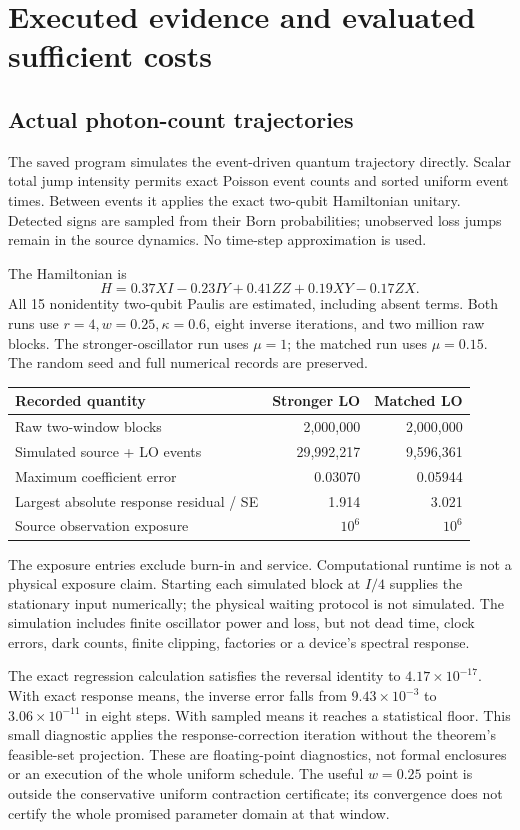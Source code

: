 \documentclass[11pt]{article}
\begin{document}
\section{Executed evidence and evaluated sufficient costs}
\subsection{Actual photon-count trajectories}
The saved program simulates the event-driven quantum trajectory directly. Scalar total jump intensity permits exact Poisson event counts and sorted uniform event times. Between events it applies the exact two-qubit Hamiltonian unitary. Detected signs are sampled from their Born probabilities; unobserved loss jumps remain in the source dynamics. No time-step approximation is used.

The Hamiltonian is
\[
 H=0.37XI-0.23IY+0.41ZZ+0.19XY-0.17ZX.
\]
All 15 nonidentity two-qubit Paulis are estimated, including absent terms. Both runs use \(r=4,w=0.25,\kappa=0.6\), eight inverse iterations, and two million raw blocks. The stronger-oscillator run uses \(\mu=1\); the matched run uses \(\mu=0.15\). The random seed and full numerical records are preserved.

\begin{center}\small
\begin{tabular}{lrr}\toprule
Recorded quantity & Stronger LO & Matched LO\\\midrule
Raw two-window blocks & 2,000,000 & 2,000,000\\
Simulated source + LO events & 29,992,217 & 9,596,361\\
Maximum coefficient error & 0.03070 & 0.05944\\
Largest absolute response residual / SE & 1.914 & 3.021\\
Source observation exposure & \(10^6\) & \(10^6\)\\\bottomrule
\end{tabular}\end{center}
The exposure entries exclude burn-in and service. Computational runtime is not a physical exposure claim. Starting each simulated block at \(I/4\) supplies the stationary input numerically; the physical waiting protocol is not simulated. The simulation includes finite oscillator power and loss, but not dead time, clock errors, dark counts, finite clipping, factories or a device's spectral response.

The exact regression calculation satisfies the reversal identity to \(4.17\times10^{-17}\). With exact response means, the inverse error falls from \(9.43\times10^{-3}\) to \(3.06\times10^{-11}\) in eight steps. With sampled means it reaches a statistical floor. This small diagnostic applies the response-correction iteration without the theorem's feasible-set projection. These are floating-point diagnostics, not formal enclosures or an execution of the whole uniform schedule. The useful \(w=0.25\) point is outside the conservative uniform contraction certificate; its convergence does not certify the whole promised parameter domain at that window.
\end{document}
